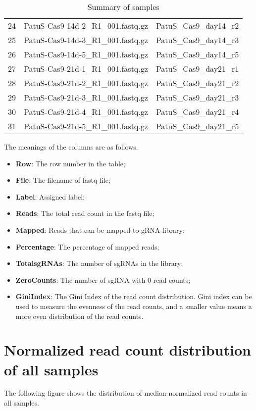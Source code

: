 \documentclass{article}
\begin{document}
\begin{table}[ht]
\begin{tabular}{cp{9cm}c}
  24 & PatuS-Cas9-14d-2\_R1\_001.fastq.gz & PatuS\_Cas9\_day14\_r2 \\ 
  25 & PatuS-Cas9-14d-3\_R1\_001.fastq.gz & PatuS\_Cas9\_day14\_r3 \\ 
  26 & PatuS-Cas9-14d-5\_R1\_001.fastq.gz & PatuS\_Cas9\_day14\_r5 \\ 
  27 & PatuS-Cas9-21d-1\_R1\_001.fastq.gz & PatuS\_Cas9\_day21\_r1 \\ 
  28 & PatuS-Cas9-21d-2\_R1\_001.fastq.gz & PatuS\_Cas9\_day21\_r2 \\ 
  29 & PatuS-Cas9-21d-3\_R1\_001.fastq.gz & PatuS\_Cas9\_day21\_r3 \\ 
  30 & PatuS-Cas9-21d-4\_R1\_001.fastq.gz & PatuS\_Cas9\_day21\_r4 \\ 
  31 & PatuS-Cas9-21d-5\_R1\_001.fastq.gz & PatuS\_Cas9\_day21\_r5 \\ 
   \hline
\end{tabular}
\caption{Summary of samples} 
\label{tab:three}
\end{table}



The meanings of the columns are as follows.

\begin{itemize}
\item \textbf{Row}: The row number in the table;
\item \textbf{File}: The filename of fastq file;
\item \textbf{Label}: Assigned label;
\item \textbf{Reads}: The total read count in the fastq file;
\item \textbf{Mapped}: Reads that can be mapped to gRNA library;
\item \textbf{Percentage}: The percentage of mapped reads;
\item \textbf{TotalsgRNAs}: The number of sgRNAs in the library; 
\item \textbf{ZeroCounts}: The number of sgRNA with 0 read counts;
\item \textbf{GiniIndex}: The Gini Index of the read count distribution. Gini index can be used to measure the evenness of the read counts, and a smaller value means a more even distribution of the read counts.
\end{itemize}



\newpage\section{Normalized read count distribution of all samples}
The following figure shows the distribution of median-normalized read counts in all samples.
\end{document}
